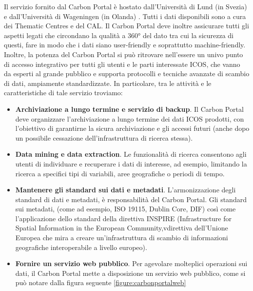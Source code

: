Il servizio fornito dal Carbon Portal è hostato dall'Università di Lund
(in Svezia) \cite{LundUniversityICOS}
e dall'Università di Wageningen (in Olanda) \cite{WageningenUniversityICOS}.
Tutti i dati disponibili sono a cura dei Thematic Centres e del CAL.
Il Carbon Portal deve inoltre assicurare tutti gli aspetti legati
che circondano la qualità a 360° del dato tra cui la 
sicurezza di questi, fare in modo che i dati siano user-friendly e
soprattutto machine-friendly. Inoltre, la potenza del
Carbon Portal si può ritrovare nell'essere un univo
punto di accesso integrativo
per tutti gli utenti e le parti interessate ICOS,
che vanno da esperti al grande pubblico e supporta
protocolli e tecniche avanzate di scambio di dati, ampiamente standardizzate.
In particolare, tra le attività e le caratteristiche di tale servizio troviamo:
\begin{itemize}
    \item \textbf{Archiviazione a lungo termine e servizio di backup}.
    Il Carbon Portal deve organizzare l'archiviazione 
    a lungo termine dei dati ICOS
    prodotti, con l'obiettivo di garantirne la sicura
    archiviazione e gli accessi futuri (anche dopo un possibile
    cessazione dell'infrastruttura di ricerca stessa).
    \item \textbf{Data mining e data extraction}.
    Le funzionalità di ricerca consentono agli utenti di
    individuare e recuperare i dati di interesse, ad esempio,
    limitando la ricerca a specifici tipi di variabili,
    aree geografiche o periodi di tempo.
    \item \textbf{Mantenere gli standard sui dati e metadati}.
    L'armonizzazione degli standard di dati e metadati, è 
    responsabilità del Carbon Portal. Gli standard sui metadati,
    (come ad esempio, ISO 19115, Dublin Core, DIF) così come
    l'applicazione dello standard della direttiva INSPIRE
    (Infrastructure for Spatial Information in the European
    Community,vdirettiva dell'Unione Europea che mira
    a creare un'infrastruttura di scambio di informazioni
    geografiche interoperabile a livello europeo).
    \item \textbf{Fornire un servizio web pubblico}.
    Per agevolare molteplici operazioni sui dati, il Carbon
    Portal mette a disposizione un servizio web pubblico, come si
    può notare dalla figura seguente \ref{figure:carbonportalweb}


\end{itemize}

